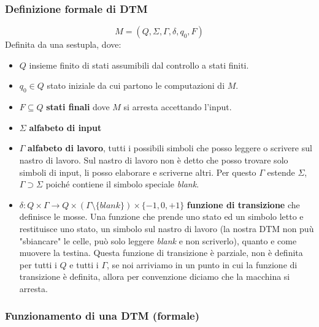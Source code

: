 \documentclass{article}
\begin{document}
\subsubsection{Definizione formale di DTM}
$$M=(Q,\Sigma,\Gamma,\delta,q_0,F)$$
Definita da una sestupla, dove:
\begin{itemize}
    \item $Q$ insieme finito di stati assumibili dal controllo a stati finiti.
    \item $q_0\in Q$ stato iniziale da cui partono le computazioni di $M$.
    \item $F\subseteq Q$ \textbf{stati finali} dove $M$ si arresta accettando l'input.
    \item $\Sigma$ \textbf{alfabeto di input}
    \item $\Gamma$ \textbf{alfabeto di lavoro}, tutti i possibili simboli che posso leggere
          o scrivere sul nastro di lavoro. Sul nastro di lavoro non è detto che posso trovare
          solo simboli di input, li posso elaborare e scriverne altri. Per questo $\Gamma$ estende
          $\Sigma$, $\Gamma\supset\Sigma$ poiché contiene il simbolo speciale \textit{blank}.
    \item $\delta:Q\times\Gamma\rightarrow Q\times(\Gamma\setminus\{blank\})\times\{-1,0,+1\}$
          \textbf{funzione di transizione} che definisce le mosse. Una funzione che prende uno stato ed
          un simbolo letto e restituisce uno stato, un simbolo sul nastro di lavoro (la nostra DTM non
          puù "sbiancare" le celle, può solo leggere \textit{blank} e non scriverlo), quanto e come muovere la testina. Questa funzione di transizione
          è parziale, non è definita per tutti i $Q$ e tutti i $\Gamma$, se noi arriviamo in un punto
          in cui la funzione di transizione è definita, allora per convenzione diciamo che la macchina
          si arresta.
\end{itemize}

\subsubsection{Funzionamento di una DTM (formale)}
\end{document}

